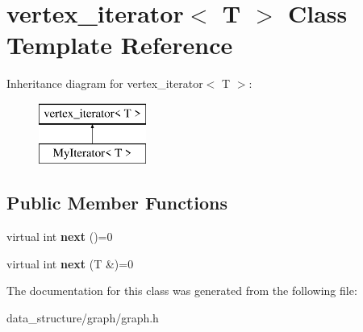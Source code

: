 \hypertarget{classvertex__iterator}{}\section{vertex\+\_\+iterator$<$ T $>$ Class Template Reference}
\label{classvertex__iterator}
Inheritance diagram for vertex\+\_\+iterator$<$ T $>$\+:\begin{figure}[H]
\begin{center}
\leavevmode
\includegraphics[height=2.000000cm]{classvertex__iterator}
\end{center}
\end{figure}
\subsection*{Public Member Functions}
\begin{DoxyCompactItemize}
\item 
\mbox{\label{classvertex__iterator_a451193f6cf58f363602cf92e9757b85d}} 
virtual int {\bfseries next} ()=0
\item 
\mbox{\label{classvertex__iterator_ae3179a8bcb5f3cb4c021d79a029fd867}} 
virtual int {\bfseries next} (T \&)=0
\end{DoxyCompactItemize}


The documentation for this class was generated from the following file\+:\begin{DoxyCompactItemize}
\item 
data\+\_\+structure/graph/graph.\+h\end{DoxyCompactItemize}
